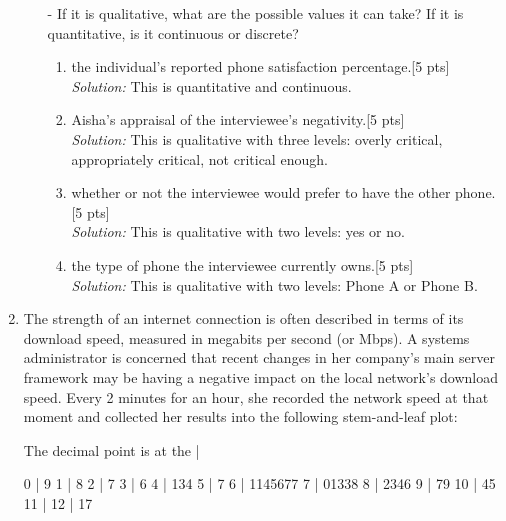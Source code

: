 \documentclass[11pt]{article}\usepackage[]{graphicx}\usepackage[]{color}
\begin{document}
\begin{enumerate}
\begin{enumerate}
      - If it is qualitative, what are the possible values it can take? If it is quantitative, is it continuous or discrete?



   \begin{enumerate}

      \item the individual's reported phone satisfaction percentage.[5 pts]\\
      \emph{Solution:} This is quantitative and continuous.

      \item Aisha's appraisal of the interviewee's negativity.[5 pts]\\
      \emph{Solution: }      This is qualitative with three levels: overly critical, appropriately critical, not critical enough.

      \item whether or not the interviewee would prefer to have the other phone.[5 pts]\\
      \emph{Solution:} This is qualitative with two levels: yes or no.


      \item the type of phone the interviewee currently owns.[5 pts]\\
      \emph{Solution: } This is qualitative with two levels: Phone A or Phone B.
   \end{enumerate}
\end{enumerate}



\item
The strength of an internet connection is often described in terms of its download speed, measured in megabits per second (or Mbps).
A systems administrator is concerned that recent changes in her company's main server framework may be having a negative impact on the local network's download speed.
Every 2 minutes for an hour, she recorded the network speed at that moment and collected her results into the following stem-and-leaf plot:

\begin{Schunk}
\begin{Soutput}
  The decimal point is at the |

   0 | 9
   1 | 8
   2 | 7
   3 | 6
   4 | 134
   5 | 7
   6 | 1145677
   7 | 01338
   8 | 2346
   9 | 79
  10 | 45
  11 | 
  12 | 17
\end{Soutput}
\end{Schunk}


\end{enumerate}
\end{document}
